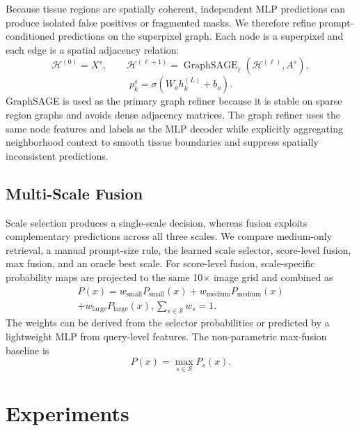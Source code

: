 \documentclass[letterpaper]{article} %
\begin{document}
Because tissue regions are spatially coherent, independent MLP predictions can produce isolated false positives or fragmented masks. We therefore refine prompt-conditioned predictions on the superpixel graph. Each node is a superpixel and each edge is a spatial adjacency relation:
\begin{equation}
    \mathcal{H}^{(0)} = X^s, \qquad
    \mathcal{H}^{(\ell+1)}
    =
    \operatorname{GraphSAGE}_{\ell}
    \left(\mathcal{H}^{(\ell)}, A^s\right),
\end{equation}
\begin{equation}
    p_k^s = \sigma\left(W_o h_k^{(L)}+b_o\right).
\end{equation}
GraphSAGE is used as the primary graph refiner because it is stable on sparse region graphs and avoids dense adjacency matrices. The graph refiner uses the same node features and labels as the MLP decoder while explicitly aggregating neighborhood context to smooth tissue boundaries and suppress spatially inconsistent predictions.

\subsection{Multi-Scale Fusion}

Scale selection produces a single-scale decision, whereas fusion exploits complementary predictions across all three scales. We compare medium-only retrieval, a manual prompt-size rule, the learned scale selector, score-level fusion, max fusion, and an oracle best scale. For score-level fusion, scale-specific probability maps are projected to the same 10$\times$ image grid and combined as
\begin{equation}
\begin{aligned}
    P(x)=
    w_{\mathrm{small}}P_{\mathrm{small}}(x)
    +w_{\mathrm{medium}}P_{\mathrm{medium}}(x)\\
    +w_{\mathrm{large}}P_{\mathrm{large}}(x),
    \sum_{s\in\mathcal{S}}w_s=1.
\end{aligned}
\end{equation}
The weights can be derived from the selector probabilities or predicted by a lightweight MLP from query-level features. The non-parametric max-fusion baseline is
\begin{equation}
    P(x)=\max_{s\in\mathcal{S}} P_s(x).
\end{equation}

\section{Experiments}
\end{document}
